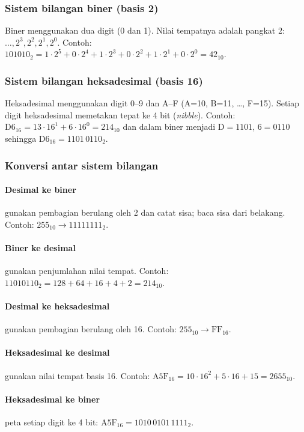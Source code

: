 \subsubsection{Sistem bilangan biner (basis 2)}
Biner menggunakan dua digit (0 dan 1). Nilai tempatnya adalah pangkat 2: \(\ldots, 2^3, 2^2, 2^1, 2^0\). Contoh: \(101010_2 = 1\cdot 2^5 + 0\cdot 2^4 + 1\cdot 2^3 + 0\cdot 2^2 + 1\cdot 2^1 + 0\cdot 2^0 = 42_{10}\).

\subsubsection{Sistem bilangan heksadesimal (basis 16)}
Heksadesimal menggunakan digit 0--9 dan A--F (A=10, B=11, \ldots, F=15). Setiap digit heksadesimal memetakan tepat ke 4 bit (\textit{nibble}). Contoh: \(\mathrm{D6}_{16} = 13\cdot 16^1 + 6\cdot 16^0 = 214_{10}\) dan dalam biner menjadi \(\mathrm{D} = 1101\), \(6 = 0110\) sehingga \(\mathrm{D6}_{16} = 1101\,0110_2\).

\subsubsection{Konversi antar sistem bilangan}
\paragraph{Desimal ke biner} gunakan pembagian berulang oleh 2 dan catat sisa; baca sisa dari belakang. Contoh: \(255_{10} \to 11111111_2\).
\paragraph{Biner ke desimal} gunakan penjumlahan nilai tempat. Contoh: \(11010110_2 = 128+64+16+4+2 = 214_{10}\).
\paragraph{Desimal ke heksadesimal} gunakan pembagian berulang oleh 16. Contoh: \(255_{10} \to \mathrm{FF}_{16}\).
\paragraph{Heksadesimal ke desimal} gunakan nilai tempat basis 16. Contoh: \(\mathrm{A5F}_{16} = 10\cdot 16^2 + 5\cdot 16 + 15 = 2655_{10}\).
\paragraph{Heksadesimal ke biner} peta setiap digit ke 4 bit: \(\mathrm{A5F}_{16} = 1010\,0101\,1111_2\).

